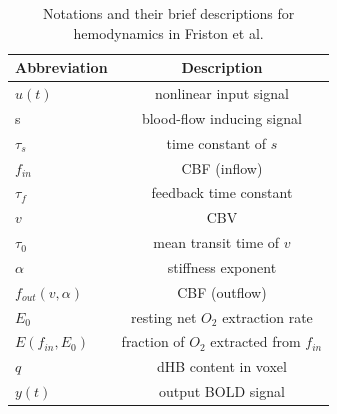 \begin{table}[h]
\begin{center}
\caption[BOLD Model Parameters]{Notations and their brief descriptions for hemodynamics in Friston et al. }
\begin{tabular}{ l | c }
  Abbreviation & Description \\
  \hline  \hline                     
  $u(t)$ &      nonlinear input signal  
\\ \hline

  s & blood-flow inducing signal 
\\ \hline
  $\tau_s$ & time constant of $s$  
\\ \hline  
  $f_{in}$ & CBF (inflow) 
 \\ \hline
 $\tau_f$  & feedback time constant 
\\ \hline  
 $v$    & CBV    
\\ \hline
 $\tau_0$  & mean transit time of $v$    
\\ \hline 
 $\alpha$  & stiffness exponent
\\ \hline 

  $f_{out}(v, \alpha)$ & CBF (outflow) 
\\ \hline
 $E_0$  & resting net $O_2$ extraction rate 
\\ \hline
 $E(f_{in}, E_0)$    & fraction of $O_2$ extracted from $f_{in}$    
\\ \hline
 $q$    &  dHB content in voxel 
\\ \hline
 $y(t)$    &  output BOLD signal          \\
\hline  
  \hline 
 
\end{tabular}
\label{table:BOLD Model Parameters}
\end{center}
\end{table}	

